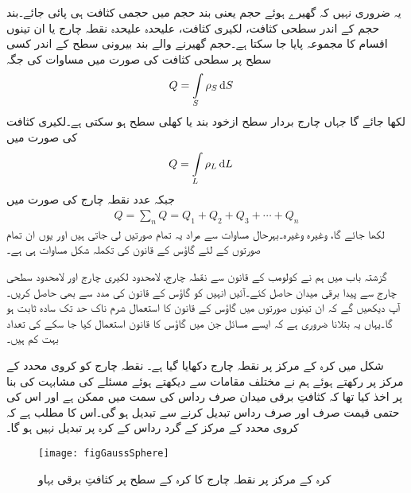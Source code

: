 یہ ضروری نہیں کہ گھیرے ہوئے حجم یعنی بند حجم میں حجمی کثافت ہی پائی جائے۔بند حجم کے اندر  سطحی کثافت، لکیری کثافت، علیحدہ علیحدہ نقطہ چارج یا ان تینوں اقسام کا مجموعہ پایا جا سکتا ہے۔حجم گھیرنے والے بند بیرونی سطح کے اندر کسی سطح پر  سطحی کثافت کی صورت میں مساوات  کی جگہ
\begin{align}
Q&=\int\limits_{S} \rho_S \dif S
\end{align}
لکھا جائے گا جہاں چارج بردار سطح ازخود بند یا کھلی سطح ہو سکتی ہے۔لکیری کثافت کی صورت میں
\begin{align}
Q&=\int\limits_{L} \rho_L \dif L
\end{align}
جبکہ   عدد نقطہ چارج کی صورت میں
\begin{align}
Q=\sum_n Q= Q_1+Q_2+Q_3+\cdots+Q_n
\end{align}
لکھا جائے گا، وغیرہ وغیرہ۔بہرحال مساوات  سے مراد یہ تمام صورتیں لی جاتی ہیں اور یوں ان تمام صورتوں کے لئے گاؤس کے  قانون کی تکملہ شکل مساوات  ہی ہے۔


گزشتہ باب میں ہم نے کولومب کے قانون سے نقطہ چارج، لامحدود  لکیری چارج اور لامحدود سطحی چارج  سے پیدا برقی میدان حاصل کئے۔آئیں انہیں کو  گاؤس کے قانون کی مدد سے بھی حاصل کریں۔ آپ دیکھیں گے کہ ان تینوں صورتوں میں گاؤس کے قانون کا استعمال شرم ناک حد تک سادہ ثابت ہو گا۔یہاں یہ بتلانا ضروری ہے کہ ایسے  مسائل جن میں گاؤس کا قانون استعمال کیا جا سکے کی تعداد  بہت کم ہیں۔

شکل  میں کرہ کے مرکز پر نقطہ چارج دکھایا گیا ہے۔ نقطہ چارج کو کروی محدد کے مرکز پر رکھتے ہوئے ہم  نے مختلف مقامات سے دیکھتے ہوئے مسئلے کی مشابہت کی بنا پر اخذ کیا تھا کہ کثافتِ برقی میدان صرف رداس کی سمت میں ممکن ہے اور اس  کی حتمی قیمت صرف اور صرف رداس  تبدیل کرنے سے تبدیل ہو گی۔اس کا مطلب ہے کہ کروی محدد کے مرکز کے گرد رداس  کے کرہ  پر  تبدیل نہیں ہو گا۔
\begin{figure}
\centering
\texttt{[image: figGaussSphere]}
\caption{کرہ کے مرکز پر نقطہ چارج کا کرہ کے سطح پر کثافتِ برقی بہاو}
\label{شکل_گاؤس_کرہ_کی_سطح_پر_مرکز_کے_نقطہ_چرج_کا_میدان}
\end{figure}

